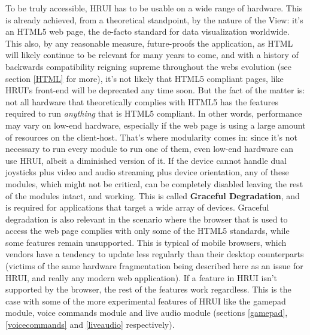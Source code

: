 To be truly accessible, HRUI has to be usable on a wide range of hardware. This is already achieved, from a theoretical 
standpoint, by the nature of the View: it's an HTML5 web page, the de-facto standard for data visualization worldwide. This 
also, by any reasonable measure, future-proofs the application, as HTML will likely continue to be relevant for many years to 
come, and with a history of backwards compatibility reigning supreme throughout the webs evolution (see section \ref{HTML} for 
more), it's not likely that HTML5 compliant pages, like HRUI's front-end will be deprecated any time soon. But the fact of the 
matter is: not all hardware that theoretically complies with HTML5 has the features required to run \textit{anything} that is 
HTML5 compliant. In other words, performance may vary on low-end hardware, especially if the web page is using a large amount 
of resources on the client-host. That's where modularity comes in: since it's not necessary to run every module to run one of 
them, even low-end hardware can use HRUI, albeit a diminished version of it. If the device cannot handle dual joysticks plus 
video and audio streaming plus device orientation, any of these modules, which might not be critical, can be completely 
disabled leaving the rest of the modules intact, and working. This is called \textbf{Graceful Degradation}, and is required 
for applications that target a wide array of devices. Graceful degradation is also relevant in the scenario where the browser 
that is used to access the web page complies with only some of the HTML5 standards, while some features remain unsupported. 
This is typical of mobile browsers, which vendors have a tendency to update less regularly than their desktop counterparts 
(victims of the same hardware fragmentation being described here as an issue for HRUI, and really any modern web application). 
If a feature in HRUI isn't supported by the browser, the rest of the features work regardless. This is the case with some of 
the more experimental features of HRUI like the gamepad module, voice commands module and live audio module (sections 
\ref{gamepad}, \ref{voicecommands}  and \ref{liveaudio} respectively).\\

